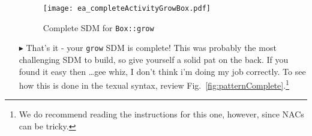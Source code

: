 \begin{itemize}
\begin{figure}[htbp]
\begin{center}
  \texttt{[image: ea\_completeActivityGrowBox.pdf]}
  \caption{Complete SDM for \texttt{Box::grow}}  
  \label{fig:sdm_grow_5}
\end{center}
\end{figure}

\item[$\blacktriangleright$]  That's it - your \texttt{grow} SDM is complete! This was probably the most challenging SDM to build, so give yourself a solid 
pat on the back. If you found it easy then \ldots gee whiz, I don't think i'm doing my job correctly. To see how this is done in the texual syntax, review
Fig.~\ref{fig:patternComplete}.\footnote{We do recommend reading the instructions for this one, however, since NACs can be tricky.}


\end{itemize}

